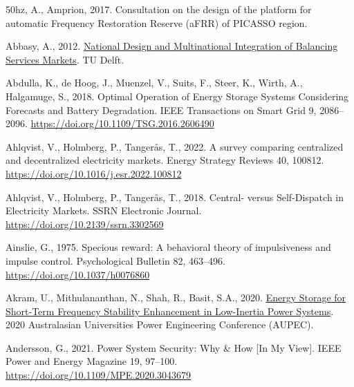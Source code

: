 \documentclass[12pt,a4paper,]{report}
\newlength{\cslhangindent}
\newenvironment{CSLReferences}[2] %
 {%
  \setlength{\parindent}{0pt}
  \ifodd #1 \everypar{\setlength{\hangindent}{\cslhangindent}}\ignorespaces\fi
  \ifnum #2 > 0
  \setlength{\parskip}{#2\baselineskip}
  \fi
 }%
 {}
\begin{document}
\hypertarget{refs}{}
\begin{CSLReferences}{1}{0}
\leavevmode{}%
50hz, A., Amprion, 2017. Consultation on the design of the platform for
automatic {Frequency Restoration Reserve} ({aFRR}) of {PICASSO} region.

\leavevmode{}%
Abbasy, A., 2012.
\href{https://doi.org/10.4233/uuid:71f7138f-3af2-4bc3-b035-a3e42b3cafaf}{National
{Design} and {Multinational Integration} of {Balancing Services
Markets}}. {TU Delft}.

\leavevmode{}%
Abdulla, K., de Hoog, J., Muenzel, V., Suits, F., Steer, K., Wirth, A.,
Halgamuge, S., 2018. Optimal {Operation} of {Energy Storage Systems
Considering Forecasts} and {Battery Degradation}. IEEE Transactions on
Smart Grid 9, 2086--2096. \url{https://doi.org/10.1109/TSG.2016.2606490}

\leavevmode{}%
Ahlqvist, V., Holmberg, P., Tangerås, T., 2022. A survey comparing
centralized and decentralized electricity markets. Energy Strategy
Reviews 40, 100812. \url{https://doi.org/10.1016/j.esr.2022.100812}

\leavevmode{}%
Ahlqvist, V., Holmberg, P., Tangerås, T., 2018. Central- versus
{Self-Dispatch} in {Electricity Markets}. SSRN Electronic Journal.
\url{https://doi.org/10.2139/ssrn.3302569}

\leavevmode{}%
Ainslie, G., 1975. Specious reward: {A} behavioral theory of
impulsiveness and impulse control. Psychological Bulletin 82, 463--496.
\url{https://doi.org/10.1037/h0076860}

\leavevmode{}%
Akram, U., Mithulananthan, N., Shah, R., Basit, S.A., 2020.
\href{https://www.semanticscholar.org/paper/Energy-Storage-for-Short-Term-Frequency-Stability-Akram-Mithulananthan/b74131f080c15125436fe65784135492fa318b02}{Energy
{Storage} for {Short-Term Frequency Stability Enhancement} in
{Low-Inertia Power Systems}}. 2020 Australasian Universities Power
Engineering Conference (AUPEC).

\leavevmode{}%
Andersson, G., 2021. Power {System Security}: {Why} \& {How} {[}{In My
View}{]}. IEEE Power and Energy Magazine 19, 97--100.
\url{https://doi.org/10.1109/MPE.2020.3043679}


\end{CSLReferences}
\end{document}
